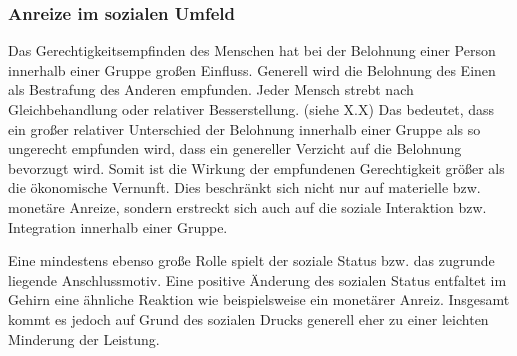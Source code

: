 \subsubsection{Anreize im sozialen Umfeld}
Das Gerechtigkeitsempfinden des Menschen hat bei der Belohnung einer Person innerhalb einer Gruppe großen Einfluss. Generell wird die Belohnung des Einen als Bestrafung des Anderen empfunden. Jeder Mensch strebt nach Gleichbehandlung oder relativer Besserstellung. (siehe X.X) Das bedeutet, dass ein großer relativer Unterschied der Belohnung innerhalb einer Gruppe als so ungerecht empfunden wird, dass ein genereller Verzicht auf die Belohnung bevorzugt wird. Somit ist die Wirkung der empfundenen Gerechtigkeit größer als die ökonomische Vernunft. Dies beschränkt sich nicht nur auf materielle bzw. monetäre Anreize, sondern erstreckt sich auch auf die soziale Interaktion bzw. Integration innerhalb einer Gruppe. \citep[S. 81ff]{Nowka.2013}
 
Eine mindestens ebenso große Rolle spielt der soziale Status bzw. das zugrunde liegende Anschlussmotiv. Eine positive Änderung des sozialen Status entfaltet im Gehirn eine ähnliche Reaktion wie beispielsweise ein monetärer Anreiz. Insgesamt kommt es jedoch auf Grund des sozialen Drucks generell eher zu einer leichten Minderung der Leistung. \citep[S. 84]{Nowka.2013}

